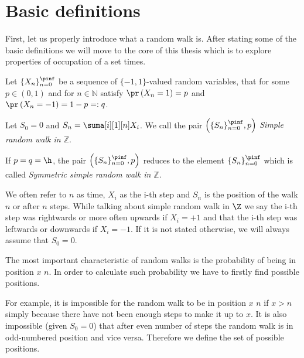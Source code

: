 \chapter{Basic definitions}

\begin{rem}
  First, let us properly introduce what a random walk is. After stating some of the basic definitions we will move to the core of this thesis which is to explore properties of occupation of a set times.
\end{rem}

\begin{defn}\label{defn-simple_random_walk_Z}
 Let $\{X_n\}_{n=0}^\pinf$ be a sequence of  \iid $\{-1,1\}$-valued random variables, that for some $p\in(0,1)$ and for $n\in \mathbb{N}$ satisfy $\pr \left( X_n=1 \right) =p$ and $\pr \left( X_n=-1 \right) =1-p=:q$.

 Let $S_0=0$ and $S_n=\suma[i][1][n]X_i$. We call the pair $ \left( \{S_n\}_{n=0}^\pinf, p \right) $ \emph{Simple random walk in $\mathbb{Z}$}.

 If $p=q=\h $, the pair $\left( \{S_n\}_{n=0}^\pinf, p \right)$ reduces to the element $\{S_n\}_{n=0}^\pinf$ which is called
\emph{Symmetric simple random walk in $\mathbb{Z}$}.
\end{defn}

\begin{rem}
 We often refer to $n$ as time, $X_i$ as the i-th step and $S_n$ is the position of the walk \intime $n$ or after $n$ steps.
 While talking about simple random walk in $\Z$ we say the i-th step was rightwards or more often upwards if $X_i=+1$ and that the i-th step was leftwards or downwards if $X_i=-1.$ If it is not stated otherwise, we will always assume that $S_0=0.$
\end{rem}

\begin{rem}
  The most important characteristic of random walks is the probability of being in position $x$ \intime $n$.
  In order to calculate such probability we have to firstly find possible positions.

  For example, it is impossible for the random walk to be in position $x$ \intime $n$ if $x>n$ simply because there have not been enough steps to make it up to $x$. It is also impossible (given $S_0=0$) that after even number of steps the random walk is in odd-numbered position and vice versa. Therefore we define the set of possible positions.
\end{rem}

